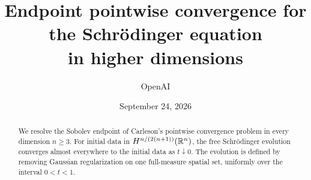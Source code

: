 \documentclass[11pt]{article}
\title{Endpoint pointwise convergence for the Schr\"odinger equation\\in higher dimensions}
\author{OpenAI}
\date{September 24, 2026}
\begin{document}
\maketitle
\begin{abstract}
We resolve the Sobolev endpoint of Carleson's pointwise convergence problem
in every dimension $n\geq3$. For initial data in
$H^{n/(2(n+1))}(\mathbb R^n)$, the free Schr\"odinger evolution converges almost
everywhere to the initial data as $t\downarrow0$. The evolution is defined by
removing Gaussian regularization on one full-measure spatial set, uniformly
over the interval $0<t<1$.
\end{abstract}
\tableofcontents








\FloatBarrier
{}
{}


\end{document}
